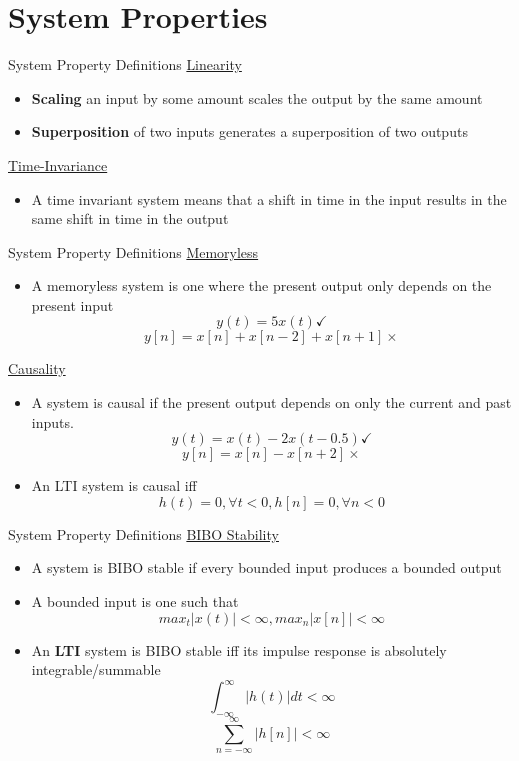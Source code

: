 \section{System Properties}


\begin{frame}{System Property Definitions}
    \underline{Linearity}
    \begin{itemize}
        \item \textbf{Scaling} an input by some amount scales the output by the same amount
        \item \textbf{Superposition} of two inputs generates a superposition of two outputs
    \end{itemize}
    \underline{Time-Invariance}
    \begin{itemize}
        \item A time invariant system means that a shift in time in the input results in the same shift in time in the output
    \end{itemize}
\end{frame}

\begin{frame}{System Property Definitions}
    \underline{Memoryless}
    \begin{itemize}
      \item A memoryless system is one where the present output only depends on the present input
      \[ y(t) = 5 x(t) \checkmark \]
      \[ y[n] = x[n] + x[n - 2] + x[n + 1] \times
      \]
    \end{itemize}
    \underline{Causality}
    \begin{itemize}
    \item A system is causal if the present output depends on only the current and past inputs.
    \[ y(t) = x(t) - 2x(t - 0.5) \checkmark \]
    \[ y[n] = x[n] - x[n + 2] \times \]
    \item An LTI system is causal iff
    \[ h(t) = 0, \forall t < 0, h[n] = 0, \forall n < 0 \]
    \end{itemize}
\end{frame}

\begin{frame}{System Property Definitions}
    \underline{BIBO Stability}
    \begin{itemize}
      \item A system is BIBO stable if every bounded input produces a bounded output
      \item A bounded input is one such that
      \[ max_t|x(t)| < \infty, max_n|x[n]| < \infty \]
    \item An \textbf{LTI} system is BIBO stable iff its impulse response is absolutely integrable/summable
    \[ \int_{-\infty}^{\infty} |h(t)|dt < \infty \]
    \[ \sum_{n=-\infty}^{\infty} |h[n]| < \infty \]
    \end{itemize}
\end{frame}
